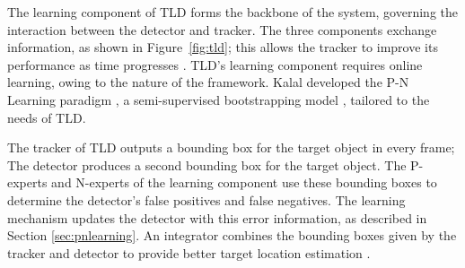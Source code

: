   The learning component of TLD forms the backbone of the system, governing the interaction between the detector and tracker.
  The three components exchange information, as shown in Figure~\ref{fig:tld}; this allows the tracker to improve its performance as time progresses \cite{Kalal2011}.
  TLD's learning component requires online learning, owing to the nature of the framework.
  Kalal developed the P-N Learning paradigm \cite{PNLearning}, a semi-supervised bootstrapping model \cite{murphy2012}, tailored to the needs of TLD.

  The tracker of TLD outputs a bounding box for the target object in every frame; The detector produces a second bounding box for the target object.
  The P-experts and N-experts of the learning component use these bounding boxes to determine the detector's false positives and false negatives.
  The learning mechanism updates the detector with this error information, as described in Section \ref{sec:pnlearning}.
  An integrator combines the bounding boxes given by the tracker and detector to provide better target location estimation \cite{Kalal2011}.
